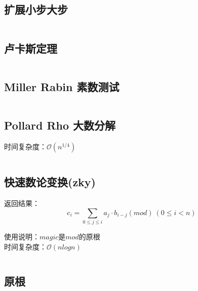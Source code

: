 \documentclass[landscape, twoside, a4paper]{article}
\newcommand{\cppcode}[1]{
	\inputminted[mathescape,
	frame=lines,linenos]{cpp}{source/#1}
}
\begin{document}
\begin{multicols}{2}
\begin{spacing}{0.8}


\subsection{扩展小步大步}

\cppcode{number-theory/exBSGS.cpp}


\subsection{卢卡斯定理}

\cppcode{number-theory/Lucas.cpp}



\subsection{Miller Rabin 素数测试}


\cppcode{number-theory/miller-rabin.cpp}


\subsection{Pollard Rho 大数分解}


时间复杂度：$\mathcal{O}(n^{1/4})$


\cppcode{number-theory/pollard-rho.cpp}




\subsection{快速数论变换(zky)}

返回结果：$$c_i=\sum_{0 \leq j \leq i} a_j \cdot b_{i-j} (mod) \ (0 \leq i < n)$$

\indent 使用说明：$magic$是$mod$的原根\\

\indent 时间复杂度：$\mathcal{O}(n log n)$

\cppcode{number-theory/number-theoretic-transform.cpp}





\subsection{原根}


\end{spacing}
\end{multicols}
\end{document}
